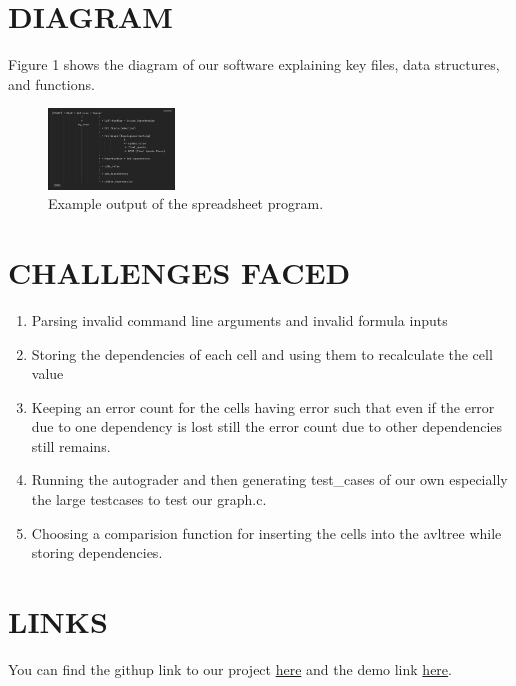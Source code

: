 \documentclass[a4paper]{article}
\begin{document}
\begin{enumerate}
    
    
\end{enumerate}

\section{DIAGRAM}
    Figure 1 shows the diagram of our software explaining key files, data structures, and functions.
\begin{figure}
\centering
\includegraphics[width=0.3\textwidth]{copass.jpg}
\caption{Example output of the spreadsheet program.}
\end{figure}


\section{CHALLENGES FACED}
\begin{enumerate}
    \item Parsing invalid command line arguments and invalid formula inputs
    \item Storing the dependencies of each cell and using them to recalculate the cell value
    \item Keeping an error count for the cells having error such that even if the error due to one dependency is lost still the error count due to other dependencies still remains.
    \item Running the autograder and then generating test\_cases of our own especially the large testcases to test our graph.c.
    \item Choosing a comparision function for inserting the cells into the avltree while storing dependencies.
\end{enumerate}

\section{LINKS}
You can find the githup link to our project \href{https://github.com/s-p-1/c-lab.git}{here} and the demo link \href{https://drive.google.com/file/d/1x1OpwUisB7BLC_H1NBsMH_u118OTXT2E/view?usp=drive_link}{here}.
\end{document}
